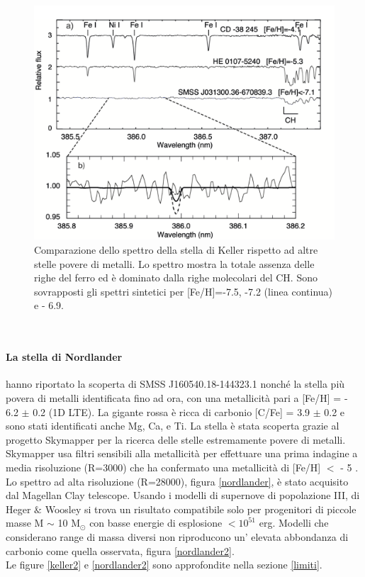 \documentclass[12pt]{article}
\begin{document}
\begin{figure}[htp!]
\center
  \includegraphics[width=1 \textwidth]{keller}
  \caption{Comparazione dello spettro della stella di Keller rispetto ad altre stelle povere di metalli. Lo spettro mostra la totale assenza delle righe del ferro ed è dominato dalla righe molecolari del CH. Sono sovrapposti gli spettri sintetici per [Fe/H]=-7.5, -7.2 (linea continua) e - 6.9. 
 }
  \label{keller}
\end{figure}
\


\paragraph{La stella di Nordlander}
\cite{nordlander} hanno riportato la scoperta di SMSS J160540.18-144323.1 nonché la stella più povera di metalli identificata fino ad ora, con una metallicità pari a [Fe/H] = - 6.2 $\pm$ 0.2  (1D LTE). La gigante rossa è ricca di carbonio [C/Fe] = 3.9 $\pm$ 0.2 e sono stati identificati anche Mg, Ca, e Ti. La stella è stata scoperta grazie al progetto Skymapper per la ricerca delle stelle estremamente povere di metalli. Skymapper usa filtri sensibili alla metallicità per effettuare una prima indagine a media risoluzione (R=3000) che ha confermato una metallicità di [Fe/H] $<$ - 5 . Lo spettro ad alta risoluzione (R=28000), figura \ref{nordlander}, è stato acquisito dal Magellan Clay telescope.
Usando i modelli di supernove di popolazione III, di Heger $\&$ Woosley si trova un risultato compatibile solo per progenitori di piccole masse M $\sim$ 10 M$_{\odot}$ con basse energie di esplosione $<10^{51}$ erg. Modelli che considerano range di massa diversi non riproducono un' elevata abbondanza di carbonio come quella osservata, figura \ref{nordlander2}. \\ Le figure \ref{keller2} e \ref{nordlander2} sono approfondite nella sezione \ref{limiti}.
\end{document}
